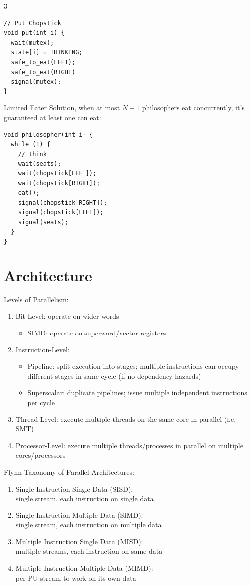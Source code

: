 \documentclass[12pt, a4paper]{article}
\begin{document}
\begin{multicols*}{3}
\begin{minipage}{0.45\columnwidth}
\begin{lstlisting}
// Put Chopstick
void put(int i) {
  wait(mutex);
  state[i] = THINKING;
  safe_to_eat(LEFT);
  safe_to_eat(RIGHT)
  signal(mutex);
}
  \end{lstlisting}
\end{minipage}
Limited Eater Solution, when at most $N-1$ philosophers eat concurrently, it's guaranteed at least one can eat:
\begin{lstlisting}
void philosopher(int i) {
  while (1) {
    // think 
    wait(seats);
    wait(chopstick[LEFT]);
    wait(chopstick[RIGHT]);
    eat();
    signal(chopstick[RIGHT]);
    signal(chopstick[LEFT]);
    signal(seats);
  }
}
\end{lstlisting}
\colbreak
\section{Architecture}
Levels of Parallelism:
\begin{enumerate}[\roman*.]
  \item Bit-Level: operate on wider words
    \begin{itemize}[leftmargin=*]\vspace{2pt}
      \item SIMD: operate on superword/vector registers 
    \end{itemize}
  \item Instruction-Level:
    \begin{itemize}[leftmargin=*]\vspace{2pt}
      \item Pipeline: split execution into stages; multiple instructions can occupy different stages in same cycle (if no dependency hazards)
      \item Superscalar: duplicate pipelines; issue multiple independent instructions per cycle
    \end{itemize}
  \item Thread-Level: execute multiple threads on the same core in parallel (i.e. SMT)
  \item Processor-Level: execute multiple threads/processes in parallel on multiple cores/processors
\end{enumerate}

Flynn Taxonomy of Parallel Architectures:
\begin{enumerate}[\roman*.]
  \item Single Instruction Single Data (SISD):\\single stream, each instruction on single data
  \item Single Instruction Multiple Data (SIMD):\\single stream, each instruction on multiple data
  \item Multiple Instruction Single Data (MISD):\\multiple streams, each instruction on same data
  \item Multiple Instruction Multiple Data (MIMD):\\per-PU stream to work on its own data
\end{enumerate}


\end{multicols*}
\end{document}
